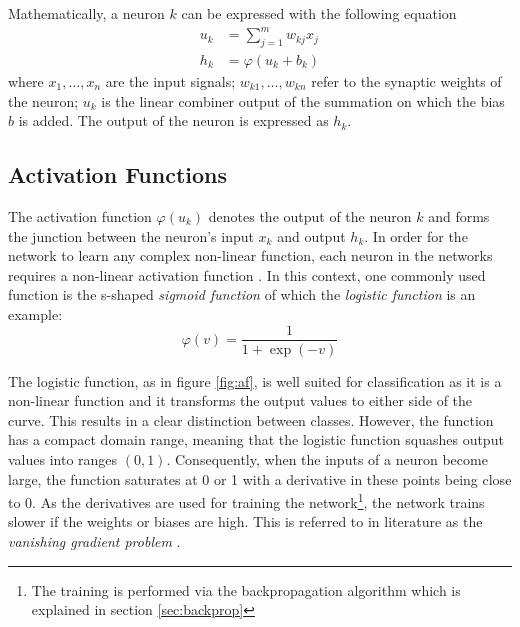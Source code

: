 Mathematically, a neuron $k$ can be expressed with the following equation \cite{Haykin:1998:NNC:521706}
\begin{eqnarray} \label{eqn:neuron1}
  u_k &= \sum_{j = 1}^{m}w_{kj}x_{j} \\
  h_k &= \varphi(u_k + b_k)
\end{eqnarray}
where $x_1, \dots, x_n$ are the input signals; $w_{k1}, \dots, w_{kn}$ refer to the synaptic weights of the neuron; $u_k$ is the linear combiner output of the summation on which the bias $b$ is added. The output of the neuron is expressed as $h_k$.

\subsection{Activation Functions}
The activation function $\varphi(u_k)$ denotes the output of the neuron $k$ and forms the junction between the neuron's input $x_k$ and output $h_k$. In order for the network to learn any complex non-linear function, each neuron in the networks requires a non-linear activation function \cite{Goodfellow-et-al-2016}. In this context, one commonly used function is the s-shaped \textit{sigmoid function} of which the \textit{logistic function} \cite{Haykin:1998:NNC:521706} is an example:\\

\begin{equation}
 \varphi(v) = \frac{1}{1 + \exp(-v)} 
\end{equation}

The logistic function, as in figure \ref{fig:af}, is well suited for classification as it is a non-linear function and it transforms the output values to either side of the curve. This results in a clear distinction between classes. However, the function has a compact domain range, meaning that the logistic function squashes output values into ranges $(0, 1)$. Consequently, when the inputs of a neuron become large, the function saturates at 0 or 1 with a derivative in these points being close to 0. As the derivatives are used for training the network\footnote{The training is performed via the backpropagation algorithm which is explained in section \ref{sec:backprop}}, the network trains slower if the weights or biases are high. This is referred to in literature as the \textit{vanishing gradient problem} \cite{Nair:2010:RLU:3104322.3104425}.\\

